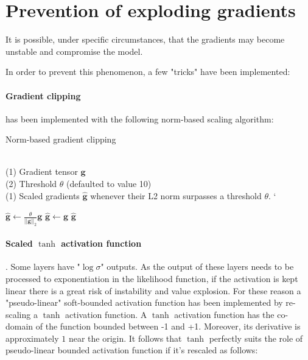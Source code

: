 \section{Prevention of exploding gradients}
It is possible, under specific circumstances, that the gradients may become unstable and
compromise the model.

In order to prevent this phenomenon, a few "tricks" have been implemented:

\paragraph{Gradient clipping}\cite{norm_clip} has been implemented with the
following norm-based scaling algorithm:

\begin{algorithm}
\caption{Norm-based gradient clipping}
\begin{algorithmic}[1]

\REQUIRE ~~\\
(1) Gradient tensor $\mathbf{g}$   \\
(2) Threshold $\theta$ (defaulted to value 10)
\ENSURE~~\\
(1) Scaled gradients $\hat{\mathbf{g}}$ whenever their L2 norm surpasses a threshold $\theta$.
`
\item[]
    \STATE $\hat{\mathbf{g}} \leftarrow \frac{\theta}{||\mathbf{g}||_2}\mathbf{g}$
\ELSE
    \STATE $\hat{\mathbf{g}} \leftarrow \mathbf{g}$
\ENDIF
\RETURN $\hat{\mathbf{g}}$
\end{algorithmic}
\end{algorithm}

\paragraph{Scaled $\tanh$ activation function}. Some layers have 
"$\log\sigma$" outputs. As the output of these layers needs to be processed to
exponentiation in the likelihood function, if the activation is kept linear
there is a great risk of instability and value explosion.
For these reason a "pseudo-linear" soft-bounded activation function has been implemented
by re-scaling a $\tanh$ activation function.
A $\tanh$ activation function has the co-domain of the function bounded between -1 and +1.
Moreover, its derivative is approximately $1$ near the origin. It follows that $\tanh$
perfectly suits the role of pseudo-linear bounded activation function if it's rescaled as
follows:

